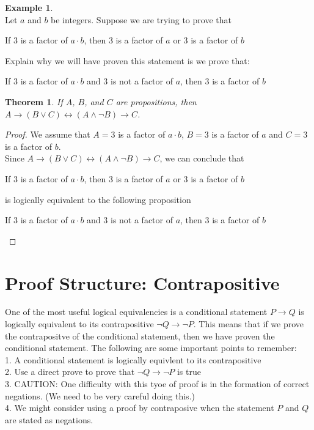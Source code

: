 \documentclass{book}
\newtheorem{theorem}{Theorem}[section]
\theoremstyle{definition}
\newtheorem{example}{Example}[definition]
\theoremstyle{remark}
\newcommand{\m}{\cdot}
\begin{document}
\begin{example}
\cite[Chap.2, P.C.2.7, Q.2]{ted} \\

Let $a$ and $b$ be integers. Suppose we are trying to prove that 
	\begin{center}
		If $3$ is a factor of $a \m b$, then $3$ is a factor of $a$ or $3$ is a factor of $b$
	\end{center} 

Explain why we will have proven this statement is we prove that:
	\begin{center}		
		If $3$ is a factor of $a \m b$ and $3$ is not a factor of $a$, then $3$ is a factor of $b$
	\end{center}

\begin{tcolorbox}
	\begin{theorem}
		If $A$, $B$, and $C$ are propositions, then $A \to (B \vee C) \leftrightarrow (A \wedge \neg B) \to C$.
	\end{theorem}
\end{tcolorbox} 
 
\begin{proof}
    We assume that $A = 3$ is a factor of $a \m b$, $B = 3$ is a factor of $a$ and $C = 3$ is a factor of $b$. \\
    Since $A \to (B \vee C) \leftrightarrow (A \wedge \neg B) \to C$, we can conclude that 
    	\begin{center}
    		If $3$ is a factor of $a \m b$, then $3$ is a factor of $a$ or $3$ is a factor of $b$
    	\end{center}
    is logically equivalent to the following proposition 
    	\begin{center}
    		If $3$ is a factor of $a \m b$ and $3$ is not a factor of $a$, then $3$ is a factor of $b$
    	\end{center}
    \end{proof}
\end{example}





\newpage
\section{Proof Structure: Contrapositive}
One of the most useful logical equivalencies is a conditional statement $P \to Q$ is logically equivalent to its contrapositive $\neg Q \to \neg P$. This means that if we prove the contrapositve of the conditional statement, then we have proven the conditional statement. The following are some important points to remember: \\
1. A conditional statement is logically equivlent to its contrapositive \\
2. Use a direct prove to prove that $\neg Q \to \neg P$ is true \\
3. CAUTION: One difficulty with this tyoe of proof is in the formation of correct negations. (We need to be very careful doing this.) \\
4. We might consider using a proof by contraposive when the statement $P$ and $Q$ are stated as negations. \\ 
\end{document}
